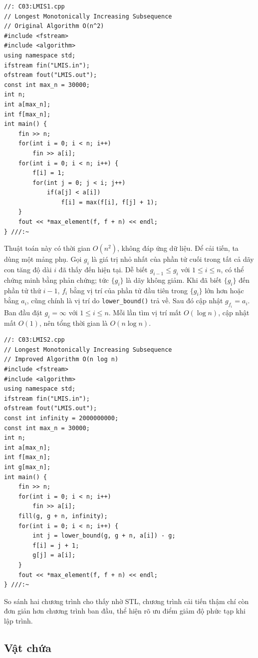 \documentclass[11pt]{article}
\begin{document}
\begin{verbatim}
//: C03:LMIS1.cpp
// Longest Monotonically Increasing Subsequence
// Original Algorithm O(n^2)
#include <fstream>
#include <algorithm>
using namespace std;
ifstream fin("LMIS.in");
ofstream fout("LMIS.out");
const int max_n = 30000;
int n;
int a[max_n];
int f[max_n];
int main() {
    fin >> n;
    for(int i = 0; i < n; i++)
        fin >> a[i];
    for(int i = 0; i < n; i++) {
        f[i] = 1;
        for(int j = 0; j < i; j++)
            if(a[j] < a[i])
                f[i] = max(f[i], f[j] + 1);
    }
    fout << *max_element(f, f + n) << endl;
} ///:~
\end{verbatim}

Thuật toán này có thời gian \(O(n^2)\), không đáp ứng dữ liệu. Để cải tiến,
ta dùng một mảng phụ. Gọi \(g_i\) là giá trị nhỏ nhất của phần tử cuối trong
tất cả dãy con tăng độ dài \(i\) đã thấy đến hiện tại. Dễ biết
\(g_{i-1}\le g_i\) với \(1\le i\le n\), có thể chứng minh bằng phản chứng;
tức \(\{g_i\}\) là dãy không giảm. Khi đã biết \(\{g_i\}\) đến phần tử thứ
\(i-1\), \(f_i\) bằng vị trí của phần tử đầu tiên trong \(\{g_i\}\) lớn hơn
hoặc bằng \(a_i\), cũng chính là vị trí do \verb|lower_bound()| trả về. Sau
đó cập nhật \(g_{f_i}=a_i\). Ban đầu đặt \(g_i=\infty\) với \(1\le i\le n\).
Mỗi lần tìm vị trí mất \(O(\log n)\), cập nhật mất \(O(1)\), nên tổng thời
gian là \(O(n\log n)\).

\begin{verbatim}
//: C03:LMIS2.cpp
// Longest Monotonically Increasing Subsequence
// Improved Algorithm O(n log n)
#include <fstream>
#include <algorithm>
using namespace std;
ifstream fin("LMIS.in");
ofstream fout("LMIS.out");
const int infinity = 2000000000;
const int max_n = 30000;
int n;
int a[max_n];
int f[max_n];
int g[max_n];
int main() {
    fin >> n;
    for(int i = 0; i < n; i++)
        fin >> a[i];
    fill(g, g + n, infinity);
    for(int i = 0; i < n; i++) {
        int j = lower_bound(g, g + n, a[i]) - g;
        f[i] = j + 1;
        g[j] = a[i];
    }
    fout << *max_element(f, f + n) << endl;
} ///:~
\end{verbatim}

So sánh hai chương trình cho thấy nhờ STL, chương trình cải tiến thậm chí còn
đơn giản hơn chương trình ban đầu, thể hiện rõ ưu điểm giảm độ phức tạp khi
lập trình.

\subsection{Vật chứa}
\end{document}

